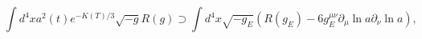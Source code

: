 \begin{equation}
\int d^4 x a^2(t) e^{-K(T)/3}\sqrt{-g} R(g)\supset \int d^4x
\sqrt{-g_E}(R(g_E)-6g_E^{\mu\nu}\partial_\mu\ln a\partial_{\nu}\ln a),
\label{pot}
\end{equation}

